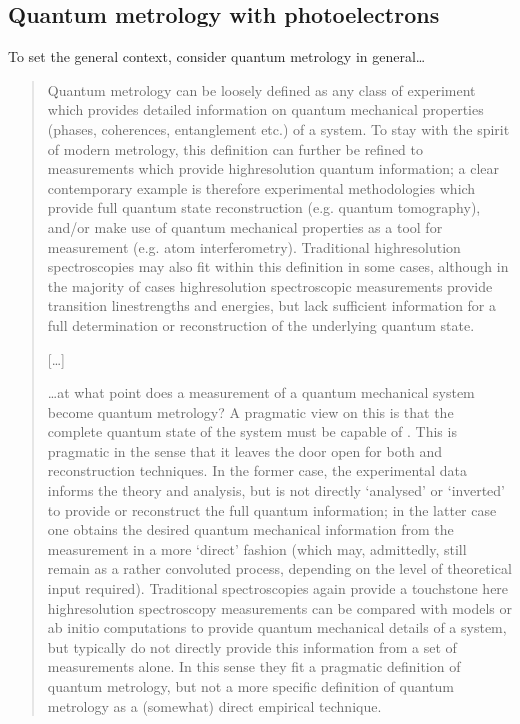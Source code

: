 \documentclass[letterpaper,table,10pt,english]{jupyterBook}
\begin{document}
\subsection{Quantum metrology with photoelectrons}
\label{\detokenize{part1/main_intro_060723:quantum-metrology-with-photoelectrons}}
\sphinxAtStartPar
To set the general context, consider quantum metrology in general…
\begin{quote}

\sphinxAtStartPar
Quantum metrology can be loosely defined as any class of experiment which provides detailed information on quantum mechanical properties (phases, coherences, entanglement etc.) of a system. To stay with the spirit of modern metrology, this definition can further be refined to measurements which provide high\sphinxhyphen{}resolution quantum information; a clear contemporary example is therefore experimental methodologies which provide full quantum state reconstruction (e.g. quantum tomography), and/or make use of quantum mechanical properties as a tool for measurement (e.g. atom interferometry). Traditional high\sphinxhyphen{}resolution spectroscopies may also fit within this definition in some cases, although in the majority of cases high\sphinxhyphen{}resolution spectroscopic measurements provide transition line\sphinxhyphen{}strengths and energies, but lack sufficient information for a full determination or reconstruction of the underlying quantum state.

\sphinxAtStartPar
{[}…{]}

\sphinxAtStartPar
…at what point does a measurement of a quantum mechanical system become quantum metrology? A pragmatic view on this is that the complete quantum state of the system must be capable of . This is pragmatic in the sense that it leaves the door open for both  and  reconstruction techniques. In the former case, the experimental data informs the theory and analysis, but is not directly ‘analysed’ or ‘inverted’ to provide or reconstruct the full quantum information; in the latter case one obtains the desired quantum mechanical information from the measurement in a more ‘direct’ fashion (which may, admittedly, still remain as a rather convoluted process, depending on the level of theoretical input required). Traditional spectroscopies again provide a touchstone here \sphinxhyphen{} high\sphinxhyphen{}resolution spectroscopy measurements can be compared with models or ab initio computations to provide quantum mechanical details of a system, but typically do not directly provide this information from a set of measurements alone. In this sense they fit a pragmatic definition of quantum metrology, but not a more specific definition of quantum metrology as a (somewhat) direct empirical technique.


\end{quote}
\end{document}
